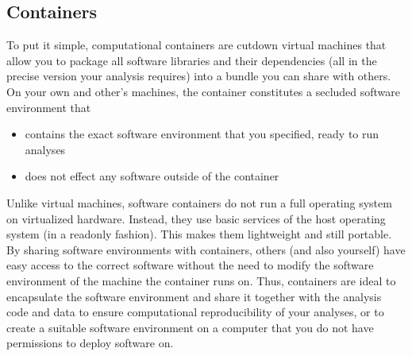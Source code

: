 \subsection{Containers}
\label{\detokenize{basics/101-133-containersrun:containers}}\label{\detokenize{basics/101-133-containersrun:index-1}}
\sphinxAtStartPar
To put it simple, computational containers are cut\sphinxhyphen{}down virtual machines that
allow you to package all software libraries and their dependencies (all in the
precise version your analysis requires) into a bundle you can share with
others. On your own and other’s machines, the container constitutes a secluded
software environment that
\begin{itemize}
\item {} 
\sphinxAtStartPar
contains the exact software environment that you specified, ready to run
analyses

\item {} 
\sphinxAtStartPar
does not effect any software outside of the container

\end{itemize}

\sphinxAtStartPar
Unlike virtual machines, software containers do not run a full operating
system on virtualized hardware. Instead, they use basic services of the host operating system
(in a read\sphinxhyphen{}only fashion). This makes them
lightweight and still portable. By sharing software environments with containers,
others (and also yourself) have easy access to the correct software
without the need to modify the software environment of the machine the
container runs on. Thus, containers are ideal to encapsulate the software
environment and share it together with the analysis code and data to ensure
computational reproducibility of your analyses, or to create a suitable
software environment on a computer that you do not have permissions to deploy
software on.

